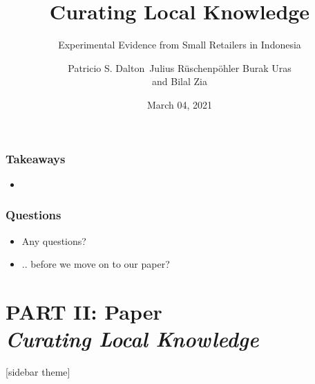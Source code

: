 \documentclass[hideothersubsections, usenames,dvipsnames,10pt]{beamer}
\begin{document}
\begin{frame}
\frametitle{Takeaways}
	\begin{itemize}
    \item
   	\vspace{0.10in}
\end{itemize}
\end{frame}

\begin{frame}
\frametitle{Questions}
	\begin{itemize}
	\item Any questions?
	\vspace{0.2in}
	\item[] .. before we move on to our paper?
	\end{itemize}
\end{frame}




\title[]{Curating Local Knowledge}
\subtitle{Experimental Evidence from Small Retailers in Indonesia}

\author[]
{Patricio S. Dalton\
Julius R{\"u}schenp{\"o}hler
Burak Uras\inst{1}\\and
Bilal Zia}


\date{March 04, 2021}


\section{\textbf{PART II: Paper} \\ \quad \emph{Curating Local Knowledge}}


\begin{frame}
\titlepage
\end{frame}


[sidebar theme]
\end{document}
